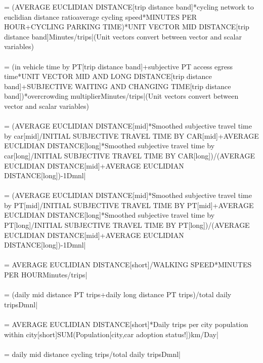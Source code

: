  = {\small (AVERAGE EUCLIDIAN DISTANCE[trip distance band]*cycling network to euclidian distance ratio\/average cycling speed*MINUTES PER HOUR+CYCLING PARKING TIME)*UNIT VECTOR MID DISTANCE[trip distance band]Minutes/trips|}{\small  (Unit vectors convert between vector and scalar variables)} \\ \\ 
 = {\small (in vehicle time by PT[trip distance band]+subjective PT access egress time*UNIT VECTOR MID AND LONG DISTANCE[trip distance band]+SUBJECTIVE WAITING AND CHANGING TIME[trip distance band])*overcrowding multiplierMinutes/trips|}{\small  (Unit vectors convert between vector and scalar variables)} \\ \\ 
 = {\small (AVERAGE EUCLIDIAN DISTANCE[mid]*Smoothed subjective travel time by car[mid]/INITIAL SUBJECTIVE TRAVEL TIME BY CAR[mid]+AVERAGE EUCLIDIAN DISTANCE[long]*Smoothed subjective travel time by car[long]/INITIAL SUBJECTIVE TRAVEL TIME BY CAR[long])/(AVERAGE EUCLIDIAN DISTANCE[mid]+AVERAGE EUCLIDIAN DISTANCE[long])-1Dmnl|} \\ \\ 
 = {\small (AVERAGE EUCLIDIAN DISTANCE[mid]*Smoothed subjective travel time by PT[mid]/INITIAL SUBJECTIVE TRAVEL TIME BY PT[mid]+AVERAGE EUCLIDIAN DISTANCE[long]*Smoothed subjective travel time by PT[long]/INITIAL SUBJECTIVE TRAVEL TIME BY PT[long])/(AVERAGE EUCLIDIAN DISTANCE[mid]+AVERAGE EUCLIDIAN DISTANCE[long])-1Dmnl|} \\ \\ 
 = {\small AVERAGE EUCLIDIAN DISTANCE[short]/WALKING SPEED*MINUTES PER HOURMinutes/trips|} \\ \\ 
 = {\small (daily mid distance PT trips+daily long distance PT trips)/total daily tripsDmnl|} \\ \\ 
 = {\small AVERAGE EUCLIDIAN DISTANCE[short]*Daily trips per city population within city[short]\*SUM(Population[city,car adoption status!])km/Day|} \\ \\ 
 = {\small daily mid distance cycling trips/total daily tripsDmnl|} \\ \\ 
